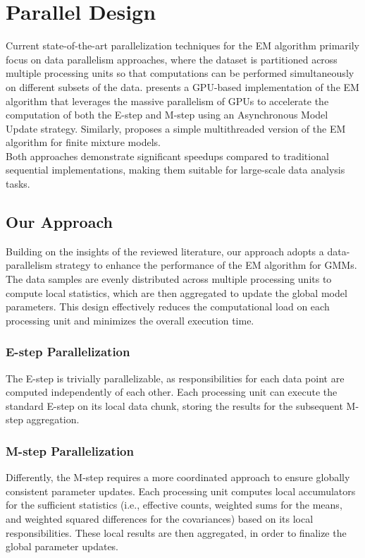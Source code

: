 \section{Parallel Design}
Current state-of-the-art parallelization techniques for the EM algorithm primarily focus on data parallelism approaches, where
the dataset is partitioned across multiple processing units so that computations can be performed simultaneously on different subsets of the data.
\cite{altinigneli2013massively} presents a GPU-based implementation of the EM algorithm that leverages the massive parallelism of GPUs to accelerate the computation of both the E-step and M-step using an Asynchronous Model Update strategy.
Similarly, \cite{lee2016simple} proposes a simple multithreaded version of the EM algorithm for finite mixture models.
\\Both approaches demonstrate significant speedups compared to traditional sequential implementations, making them suitable for large-scale data analysis tasks.

\subsection{Our Approach}
Building on the insights of the reviewed literature, our approach adopts a data-parallelism strategy to enhance the performance of the EM algorithm for GMMs.
The data samples are evenly distributed across multiple processing units to compute local statistics, which are then aggregated to update the global model parameters.
This design effectively reduces the computational load on each processing unit and minimizes the overall execution time.

\subsubsection*{E-step Parallelization}
The E-step is trivially parallelizable, as responsibilities for each data point are computed independently of each other.
Each processing unit can execute the standard E-step on its local data chunk, storing the results for the subsequent
M-step aggregation.

\subsubsection*{M-step Parallelization}
Differently, the M-step requires a more coordinated approach to ensure globally consistent parameter updates.
Each processing unit computes local accumulators for the sufficient statistics (i.e., effective counts, weighted sums for the means, and weighted squared differences for the covariances) based on its local responsibilities.
These local results are then aggregated, in order to finalize the global parameter updates.

